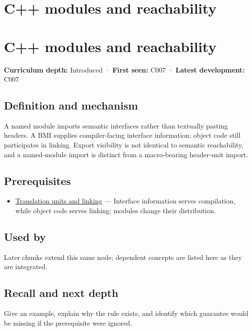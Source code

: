 \hypertarget{appendix-410a611a5b8d}{}
\section*{C++ modules and reachability}
\section{C++ modules and reachability}\label{c-modules-and-reachability}

\textbf{Curriculum depth:} Introduced · \textbf{First seen:} C007 · \textbf{Latest development:} C007

\subsection{Definition and mechanism}\label{definition-and-mechanism}

A named module imports semantic interfaces rather than textually pasting headers. A BMI supplies compiler-facing interface information; object code still participates in linking. Export visibility is not identical to semantic reachability, and a named-module import is distinct from a macro-bearing header-unit import.

\subsection{Prerequisites}\label{prerequisites}

\begin{itemize}
\tightlist
\item
  \hyperref[appendix-806686359e1b]{Translation units and linking} --- Interface information serves compilation, while object code serves linking; modules change their distribution.
\end{itemize}

\subsection{Used by}\label{used-by}

Later chunks extend this same node; dependent concepts are listed here as they are integrated.

\subsection{Recall and next depth}\label{recall-and-next-depth}

Give an example, explain why the rule exists, and identify which guarantee would be missing if the prerequisite were ignored.

